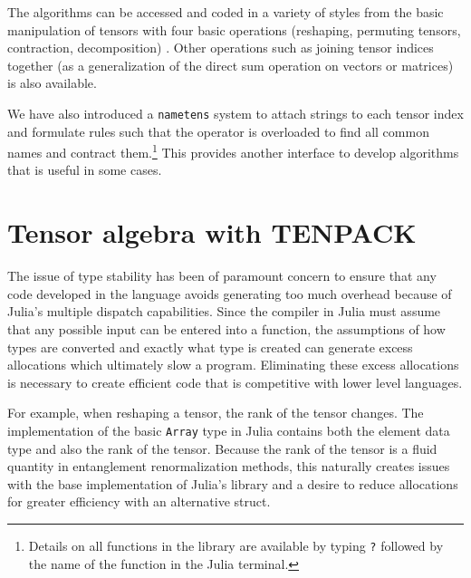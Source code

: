 \documentclass{juliacon}
\begin{document}
The algorithms can be accessed and coded in a variety of styles from the basic manipulation of tensors with four basic operations (reshaping, permuting tensors, contraction, decomposition) \cite{bakerCJP21,dmrjulia1}. Other operations such as joining tensor indices together (as a generalization of the direct sum operation on vectors or matrices) is also available. 

We have also introduced a {\tt nametens} system to attach strings to each tensor index and formulate rules such that the {\tt *} operator is overloaded to find all common names and contract them.\footnote{Details on all functions in the library are available by typing {\tt ?} followed by the name of the function in the Julia terminal.} This provides another interface to develop algorithms that is useful in some cases.


\section{Tensor algebra with TENPACK}

The issue of type stability has been of paramount concern to ensure that any code developed in the language avoids generating too much overhead because of Julia's multiple dispatch capabilities. Since the compiler in Julia must assume that any possible input can be entered into a function, the assumptions of how types are converted and exactly what type is created can generate excess allocations which ultimately slow a program. Eliminating these excess allocations is necessary to create efficient code that is competitive with lower level languages.

For example, when reshaping a tensor, the rank of the tensor changes. The implementation of the basic {\tt Array} type in Julia contains both the element data type and also the rank of the tensor. Because the rank of the tensor is a fluid quantity in entanglement renormalization methods, this naturally creates issues with the base implementation of Julia's library and a desire to reduce allocations for greater efficiency with an alternative struct.
\end{document}
